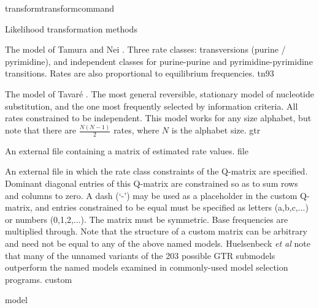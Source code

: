\begin{command}{transform}{transformcommand}
\begin{arguments}
\begin{argumentgroup}{Likelihood transformation methods}
{\begin{description}
                        {The model of Tamura and Nei \cite{tamura1993}. Three
                        rate classes: transversions (purine / pyrimidine), and
                        independent classes for purine-purine and
                        pyrimidine-pyrimidine transitions. Rates are also
                        proportional to equilibrium frequencies.}
                        {tn93}

                        {The model of Tavar\'{e} \cite{tavare1986}. The most general
                        reversible, stationary model of nucleotide substitution,
                        and the one most frequently selected by information
                        criteria. All rates constrained to be independent. This
                        model works for any size alphabet, but note that there
                        are $\frac{N (N-1)}{2}$ rates, where $N$ is the alphabet
                        size.}
                        {gtr}

                        {An external file containing a matrix of estimated rate
                        values.}
                        {file}

                        {An external file in which the rate class constraints of
                        the Q-matrix are specified. Dominant diagonal entries of
                        this Q-matrix are constrained so as to sum rows and
                        columns to zero.  A dash (`-') may be used as a
                        placeholder in the custom Q-matrix, and entries
                        constrained to be equal must be specified as letters
                        (a,b,c,...) or numbers (0,1,2,...). The matrix must be
                        symmetric. Base frequencies are multiplied through. Note
                        that the structure of a custom matrix can be arbitrary
                        and need not be equal to any of the above named models.
                        Huelsenbeck \emph{et al} \cite{huelsenbeck2004bayesian} note that many of the
                        unnamed variants of the 203 possible GTR submodels
                        outperform the named models examined in commonly-used
                        model selection programs.}
                        {custom}

                \end{description}}
            {model}


\end{argumentgroup}
\end{arguments}
\end{command}

